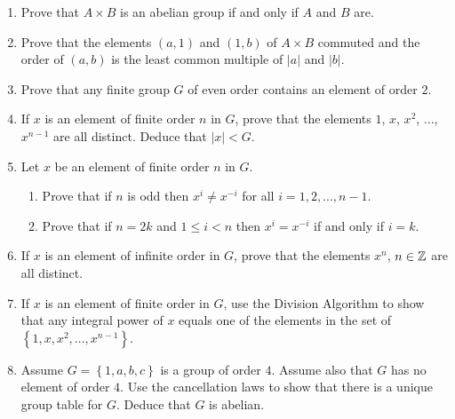 \begin{enumerate}
\begin{enumerate}
		\end{enumerate}
		\item Prove that $A\times B$ is an abelian group if and only if $A$ and $B$ are.
		\item Prove that the elements $(a,1)$ and $(1,b)$ of $A\times B$ commuted and the order of $(a,b)$ is the least common multiple of $|a|$ and $|b|$.
		\item Prove that any finite group $G$ of even order contains an element of order $2$.
		\item If $x$ is an element of finite order $n$ in $G$, prove that the elements $1$, $x$, $x^2$, ..., $x^{n-1}$ are all distinct.  Deduce that $|x|<G$.
		\item Let $x$ be an element of finite order $n$ in $G$.
		\begin{enumerate}
			\item Prove that if $n$ is odd then $x^i \neq x^{-i}$ for all $i =  1,2,...,n-1$.
			\item Prove that if $n = 2k$ and $1\leq i<n$ then $x^i = x^{-i}$ if and only if $i = k$.
		\end{enumerate}
		\item If $x$ is an element of infinite order in $G$, prove that the elements $x^n$, $n\in\mathbb{Z}$ are all distinct.
		\item If $x$ is an element of finite order in $G$, use the Division Algorithm to show that any integral power of $x$ equals one of the elements in the set of $\left\{ 1,x,x^2,...,x^{n-1} \right\}$.
		\item Assume $G = \left\{ 1,a,b,c \right\}$ is a group of order $4$.  Assume also that $G$ has no element of order $4$.  Use the cancellation laws to show that there is a unique group table for $G$.  Deduce that $G$ is abelian.
	\end{enumerate}

